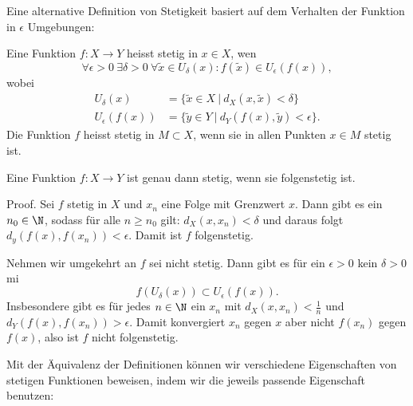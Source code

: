 \documentclass[letterpaper,10pt,english]{jupyterBook}
\begin{document}
Eine alternative Definition von Stetigkeit basiert auf dem Verhalten der Funktion in \(\epsilon\) Umgebungen:
\label{stetigkeit/stetigkeit:definition-3}
\begin{definition}{}{}



Eine Funktion \(f: X \rightarrow Y\) heisst stetig in \(x \in X\), wen
\begin{equation*}
 \forall \epsilon > 0 ~\exists \delta > 0 ~\forall \tilde{x} \in U_\delta(x): f(\tilde x) \in U_\epsilon(f(x)),
\end{equation*}
wobei
\begin{align*}
U_\delta(x) &= \{\tilde x \in X~|~d_X(x,\tilde x) < \delta \} \\
U_\epsilon(f(x)) &= \{\tilde y \in Y~|~d_Y(f(x),\tilde y) < \epsilon \}.
\end{align*}
Die Funktion \(f\) heisst stetig in \(M \subset X\), wenn sie in allen Punkten \(x\in M\) stetig ist.
\end{definition}
\label{stetigkeit/stetigkeit:theorem-4}
\begin{theorem}{}{}



Eine Funktion \(f: X \rightarrow Y\) ist genau dann stetig, wenn sie folgenstetig ist.
\end{theorem}

\begin{emphBox}{}{}
Proof.  Sei \(f\) stetig in \(X\) und \(x_n\) eine Folge mit Grenzwert \(x\). Dann gibt es ein \(n_0 \in \N\), sodass für alle \(n \geq n_0\) gilt: \( d_X(x,x_n) < \delta\) und daraus folgt \( d_y(f(x),f(x_n)) < \epsilon\). Damit ist \(f\) folgenstetig.

Nehmen wir umgekehrt an \(f\) sei nicht stetig. Dann gibt es für ein \(\epsilon > 0\) kein \(\delta > 0\) mi
\begin{equation*}
 f(U_\delta(x)) \subset U_\epsilon (f(x)).
\end{equation*}
Insbesondere gibt es für jedes \(n \in \N\) ein \(x_n\) mit \(d_X(x,x_n) < \frac{1}n\) und \(d_Y(f(x),f(x_n)) > \epsilon\). Damit konvergiert \(x_n\) gegen \(x\) aber nicht \(f(x_n)\) gegen \(f(x)\), also ist \(f\) nicht folgenstetig.
\end{emphBox}

Mit der Äquivalenz der Definitionen können wir verschiedene Eigenschaften von stetigen Funktionen beweisen, indem wir die jeweils passende Eigenschaft benutzen:
\label{stetigkeit/stetigkeit:theorem-5}
\begin{theorem}{}{}


\end{theorem}
\end{document}
